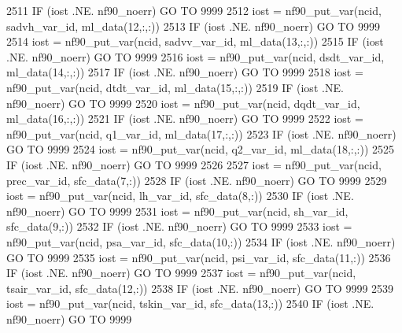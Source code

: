 \begin{DoxyCode}
{{{{{{2511     \textcolor{keywordflow}{IF} (iost .NE. nf90\_noerr) \textcolor{keywordflow}{GO TO} 9999
2512     iost    = nf90\_put\_var(ncid,    sadvh\_var\_id,       ml\_data(12,:,:))
2513     \textcolor{keywordflow}{IF} (iost .NE. nf90\_noerr) \textcolor{keywordflow}{GO TO} 9999
2514     iost    = nf90\_put\_var(ncid,    sadvv\_var\_id,       ml\_data(13,:,:))
2515     \textcolor{keywordflow}{IF} (iost .NE. nf90\_noerr) \textcolor{keywordflow}{GO TO} 9999
2516     iost    = nf90\_put\_var(ncid,    dsdt\_var\_id,        ml\_data(14,:,:))
2517     \textcolor{keywordflow}{IF} (iost .NE. nf90\_noerr) \textcolor{keywordflow}{GO TO} 9999
2518     iost    = nf90\_put\_var(ncid,    dtdt\_var\_id,        ml\_data(15,:,:))
2519     \textcolor{keywordflow}{IF} (iost .NE. nf90\_noerr) \textcolor{keywordflow}{GO TO} 9999
2520     iost    = nf90\_put\_var(ncid,    dqdt\_var\_id,        ml\_data(16,:,:))
2521     \textcolor{keywordflow}{IF} (iost .NE. nf90\_noerr) \textcolor{keywordflow}{GO TO} 9999
2522     iost    = nf90\_put\_var(ncid,    q1\_var\_id,          ml\_data(17,:,:))
2523     \textcolor{keywordflow}{IF} (iost .NE. nf90\_noerr) \textcolor{keywordflow}{GO TO} 9999
2524     iost    = nf90\_put\_var(ncid,    q2\_var\_id,          ml\_data(18,:,:))
2525     \textcolor{keywordflow}{IF} (iost .NE. nf90\_noerr) \textcolor{keywordflow}{GO TO} 9999
2526 
2527     iost    = nf90\_put\_var(ncid,    prec\_var\_id,        sfc\_data(7,:))
2528     \textcolor{keywordflow}{IF} (iost .NE. nf90\_noerr) \textcolor{keywordflow}{GO TO} 9999
2529     iost    = nf90\_put\_var(ncid,    lh\_var\_id,          sfc\_data(8,:))
2530     \textcolor{keywordflow}{IF} (iost .NE. nf90\_noerr) \textcolor{keywordflow}{GO TO} 9999
2531     iost    = nf90\_put\_var(ncid,    sh\_var\_id,          sfc\_data(9,:))
2532     \textcolor{keywordflow}{IF} (iost .NE. nf90\_noerr) \textcolor{keywordflow}{GO TO} 9999
2533     iost    = nf90\_put\_var(ncid,    psa\_var\_id,         sfc\_data(10,:))
2534     \textcolor{keywordflow}{IF} (iost .NE. nf90\_noerr) \textcolor{keywordflow}{GO TO} 9999
2535     iost    = nf90\_put\_var(ncid,    psi\_var\_id,         sfc\_data(11,:))
2536     \textcolor{keywordflow}{IF} (iost .NE. nf90\_noerr) \textcolor{keywordflow}{GO TO} 9999
2537     iost    = nf90\_put\_var(ncid,    tsair\_var\_id,       sfc\_data(12,:))
2538     \textcolor{keywordflow}{IF} (iost .NE. nf90\_noerr) \textcolor{keywordflow}{GO TO} 9999
2539     iost    = nf90\_put\_var(ncid,    tskin\_var\_id,       sfc\_data(13,:))
2540     \textcolor{keywordflow}{IF} (iost .NE. nf90\_noerr) \textcolor{keywordflow}{GO TO} 9999
}}}}}}
\end{DoxyCode}

